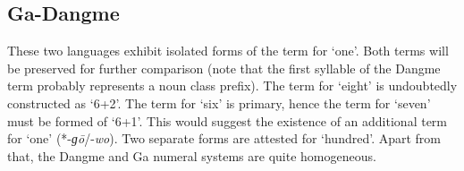 \subsection{Ga-Dangme}%


These two languages exhibit isolated forms of the term for ‘one’. Both terms will be preserved for further comparison (note that the first syllable of the Dangme term probably represents a noun class prefix). The term for ‘eight’ is undoubtedly constructed as ‘6+2’. The term for ‘six’ is primary, hence the term for ‘seven’ must be formed of ‘6+1’. This would suggest the existence of an additional term for ‘one’ (*-\textit{ɡ{\={o}}}/-\textit{wo}). Two separate forms are attested for ‘hundred’. Apart from that, the Dangme and Ga numeral systems are quite homogeneous.
